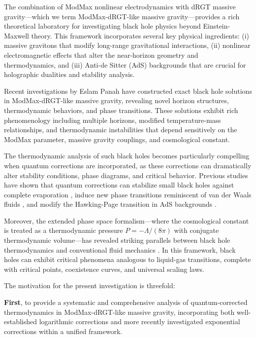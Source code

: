 \documentclass[12pt]{article}
\begin{document}
The combination of ModMax nonlinear electro\-dynamics with dRGT massive gravity—which we term ModMax-dRGT-like massive gravity—provides a rich theoretical laboratory for investigating black hole physics beyond Einstein-Maxwell theory. This framework incorporates several key physical ingredients: (i) massive gravitons that modify long-range gravitational interactions, (ii) nonlinear electromagnetic effects that alter the near-horizon geometry and thermodynamics, and (iii) Anti-de Sitter (AdS) backgrounds that are crucial for holographic dualities and stability analysis.

Recent investigations by Eslam Panah \cite{EslamPanah2025} have constructed exact black hole solutions in ModMax-dRGT-like massive gravity, revealing novel horizon structures, thermodynamic behaviors, and phase transitions. These solutions exhibit rich phenomenology including multiple horizons, modified temperature-mass relationships, and thermodynamic instabilities that depend sensitively on the ModMax parameter, massive gravity couplings, and cosmological constant.

The thermodynamic analysis of such black holes becomes particularly compelling when quantum corrections are incorporated, as these corrections can dramatically alter stability conditions, phase diagrams, and critical behavior. Previous studies have shown that quantum corrections can stabilize small black holes against complete evaporation \cite{Banerjee2008}, induce new phase transitions reminiscent of van der Waals fluids \cite{Kubiznak2012}, and modify the Hawking-Page transition in AdS backgrounds \cite{Witten1998}.

Moreover, the extended phase space formalism—where the cosmo\-logical constant is treated as a thermodynamic pressure $P = -\Lambda/(8\pi)$ with conjugate thermodynamic volume—has revealed striking parallels between black hole thermodynamics and conventional fluid mechanics \cite{Kastor2009,Dolan2011}. In this framework, black holes can exhibit critical phenomena analogous to liquid-gas transitions, complete with critical points, coexistence curves, and universal scaling laws.

The motivation for the present investigation is threefold: 

\textbf{First}, to provide a systematic and comprehensive analysis of quantum-corrected thermodynamics in ModMax-dRGT-like massive gravity, incorporating both well-established logarithmic corrections and more recently investigated exponential corrections within a unified framework.
\end{document}
